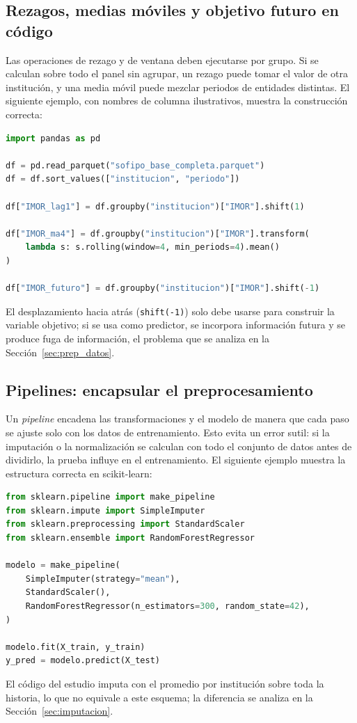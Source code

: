 \subsection{Rezagos, medias móviles y objetivo futuro en código}
Las operaciones de rezago y de ventana deben ejecutarse por grupo. Si se calculan sobre todo el panel sin agrupar, un rezago puede tomar el valor de otra institución, y una media móvil puede mezclar periodos de entidades distintas. El siguiente ejemplo, con nombres de columna ilustrativos, muestra la construcción correcta:
\begin{lstlisting}[language=Python, caption={Construcción de rezagos, medias móviles y objetivo futuro dentro de cada institución}, label={lst:rezagos}]
import pandas as pd

df = pd.read_parquet("sofipo_base_completa.parquet")
df = df.sort_values(["institucion", "periodo"])

df["IMOR_lag1"] = df.groupby("institucion")["IMOR"].shift(1)

df["IMOR_ma4"] = df.groupby("institucion")["IMOR"].transform(
    lambda s: s.rolling(window=4, min_periods=4).mean()
)

df["IMOR_futuro"] = df.groupby("institucion")["IMOR"].shift(-1)
\end{lstlisting}
El desplazamiento hacia atrás (\texttt{shift(-1)}) solo debe usarse para construir la variable objetivo; si se usa como predictor, se incorpora información futura y se produce fuga de información, el problema que se analiza en la Sección~\ref{sec:prep_datos}.

\subsection{Pipelines: encapsular el preprocesamiento}
Un \textit{pipeline} encadena las transformaciones y el modelo de manera que cada paso se ajuste solo con los datos de entrenamiento. Esto evita un error sutil: si la imputación o la normalización se calculan con todo el conjunto de datos antes de dividirlo, la prueba influye en el entrenamiento. El siguiente ejemplo muestra la estructura correcta en scikit-learn:
\begin{lstlisting}[language=Python, caption={Pipeline en el que la imputación y la escala se ajustan solo con el conjunto de entrenamiento}, label={lst:pipeline}]
from sklearn.pipeline import make_pipeline
from sklearn.impute import SimpleImputer
from sklearn.preprocessing import StandardScaler
from sklearn.ensemble import RandomForestRegressor

modelo = make_pipeline(
    SimpleImputer(strategy="mean"),
    StandardScaler(),
    RandomForestRegressor(n_estimators=300, random_state=42),
)

modelo.fit(X_train, y_train)
y_pred = modelo.predict(X_test)
\end{lstlisting}
El código del estudio imputa con el promedio por institución sobre toda la historia, lo que no equivale a este esquema; la diferencia se analiza en la Sección~\ref{sec:imputacion}.

